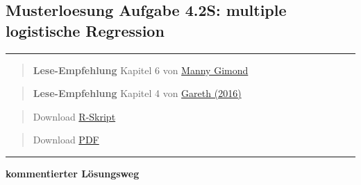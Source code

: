 \documentclass[
]{article}
\author{}
\date{\vspace{-2.5em}}
\begin{document}
\hypertarget{musterloesung-aufgabe-4.2s-multiple-logistische-regression}{%
\subsection{Musterloesung Aufgabe 4.2S: multiple logistische
Regression}\label{musterloesung-aufgabe-4.2s-multiple-logistische-regression}}

\begin{center}\rule{0.5\linewidth}{0.5pt}\end{center}

\begin{quote}
\textbf{Lese-Empfehlung} Kapitel 6 von
\href{https://mgimond.github.io/Stats-in-R/Logistic.html}{Manny Gimond}
\end{quote}

\begin{quote}
\textbf{Lese-Empfehlung} Kapitel 4 von
\href{http://faculty.marshall.usc.edu/gareth-james/ISL/ISLR\%20Seventh\%20Printing.pdf}{Gareth
(2016)}
\end{quote}

\begin{quote}
Download \href{16_Statistik4/RFiles/solution_stat4.2s.R}{R-Skript}
\end{quote}

\begin{quote}
Download \href{16_Statistik4/RFiles/solution_stat4.2s.pdf}{PDF}
\end{quote}

\begin{center}\rule{0.5\linewidth}{0.5pt}\end{center}

\textbf{kommentierter Lösungsweg}
\end{document}
